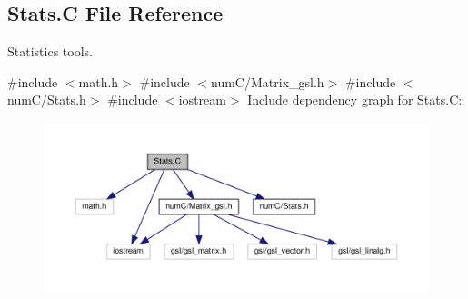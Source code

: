 \hypertarget{Stats_8C}{}\subsection{Stats.\+C File Reference}
\label{Stats_8C}


Statistics tools.  


{\ttfamily \#include $<$math.\+h$>$}\newline
{\ttfamily \#include $<$num\+C/\+Matrix\+\_\+gsl.\+h$>$}\newline
{\ttfamily \#include $<$num\+C/\+Stats.\+h$>$}\newline
{\ttfamily \#include $<$iostream$>$}\newline
Include dependency graph for Stats.\+C\+:\nopagebreak
\begin{figure}[H]
\begin{center}
\leavevmode
\includegraphics[width=350pt]{Stats_8C__incl}
\end{center}
\end{figure}
